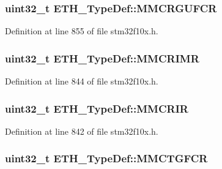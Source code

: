 \subsubsection[{\texorpdfstring{M\+M\+C\+R\+G\+U\+F\+CR}{MMCRGUFCR}}]{ {\bf uint32\+\_\+t} E\+T\+H\+\_\+\+Type\+Def\+::\+M\+M\+C\+R\+G\+U\+F\+CR}\hypertarget{struct_e_t_h___type_def_a832a684c8f476941845d0fcba0fb75fc}{}\label{struct_e_t_h___type_def_a832a684c8f476941845d0fcba0fb75fc}


Definition at line 855 of file stm32f10x.\+h.

\subsubsection[{\texorpdfstring{M\+M\+C\+R\+I\+MR}{MMCRIMR}}]{ {\bf uint32\+\_\+t} E\+T\+H\+\_\+\+Type\+Def\+::\+M\+M\+C\+R\+I\+MR}\hypertarget{struct_e_t_h___type_def_a80c2cf41b95fc14f304d60e4421b1bbd}{}\label{struct_e_t_h___type_def_a80c2cf41b95fc14f304d60e4421b1bbd}


Definition at line 844 of file stm32f10x.\+h.

\subsubsection[{\texorpdfstring{M\+M\+C\+R\+IR}{MMCRIR}}]{ {\bf uint32\+\_\+t} E\+T\+H\+\_\+\+Type\+Def\+::\+M\+M\+C\+R\+IR}\hypertarget{struct_e_t_h___type_def_a336820119836db549e754619be7f6aa5}{}\label{struct_e_t_h___type_def_a336820119836db549e754619be7f6aa5}


Definition at line 842 of file stm32f10x.\+h.

\subsubsection[{\texorpdfstring{M\+M\+C\+T\+G\+F\+CR}{MMCTGFCR}}]{ {\bf uint32\+\_\+t} E\+T\+H\+\_\+\+Type\+Def\+::\+M\+M\+C\+T\+G\+F\+CR}\hypertarget{struct_e_t_h___type_def_a0e2a79b3b31db0f07e269db092a74f1e}{}\label{struct_e_t_h___type_def_a0e2a79b3b31db0f07e269db092a74f1e}


